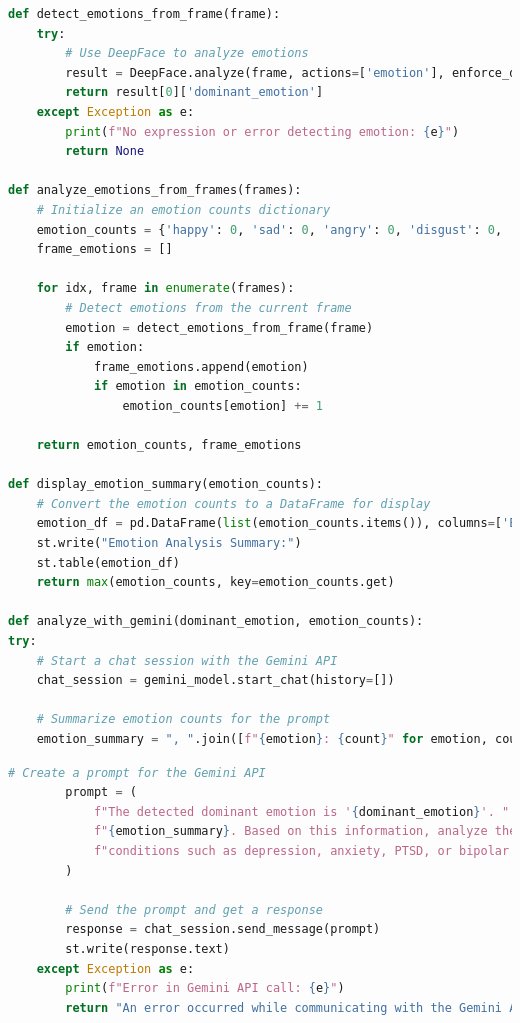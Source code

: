 \pagebreak



\begin{tcolorbox}[colback=gray!5!white, colframe=gray!80!black, boxrule=0.5pt, title=Emotion Analysis and Mental Health Insights]
    \begin{lstlisting}[language=Python]
def detect_emotions_from_frame(frame):
    try:
        # Use DeepFace to analyze emotions
        result = DeepFace.analyze(frame, actions=['emotion'], enforce_detection=False)
        return result[0]['dominant_emotion']
    except Exception as e:
        print(f"No expression or error detecting emotion: {e}")
        return None

def analyze_emotions_from_frames(frames):
    # Initialize an emotion counts dictionary
    emotion_counts = {'happy': 0, 'sad': 0, 'angry': 0, 'disgust': 0, 'fear': 0, 'surprise': 0, 'neutral': 0}
    frame_emotions = []

    for idx, frame in enumerate(frames):
        # Detect emotions from the current frame
        emotion = detect_emotions_from_frame(frame)
        if emotion:
            frame_emotions.append(emotion)
            if emotion in emotion_counts:
                emotion_counts[emotion] += 1

    return emotion_counts, frame_emotions

def display_emotion_summary(emotion_counts):
    # Convert the emotion counts to a DataFrame for display
    emotion_df = pd.DataFrame(list(emotion_counts.items()), columns=['Emotion', 'Count'])
    st.write("Emotion Analysis Summary:")
    st.table(emotion_df)
    return max(emotion_counts, key=emotion_counts.get)

def analyze_with_gemini(dominant_emotion, emotion_counts):
try:
    # Start a chat session with the Gemini API
    chat_session = gemini_model.start_chat(history=[])

    # Summarize emotion counts for the prompt
    emotion_summary = ", ".join([f"{emotion}: {count}" for emotion, count in emotion_counts.items()])
    \end{lstlisting}
\end{tcolorbox}
\begin{tcolorbox}[colback=gray!5!white, colframe=gray!80!black, boxrule=0.5pt, title=Emotion Analysis and Mental Health Insights]
    \begin{lstlisting}[language=Python]
        # Create a prompt for the Gemini API
        prompt = (
            f"The detected dominant emotion is '{dominant_emotion}'. "
            f"{emotion_summary}. Based on this information, analyze the potential implications for mental health "
            f"conditions such as depression, anxiety, PTSD, or bipolar disorder. Provide actionable insights in three lines."
        )

        # Send the prompt and get a response
        response = chat_session.send_message(prompt)
        st.write(response.text)
    except Exception as e:
        print(f"Error in Gemini API call: {e}")
        return "An error occurred while communicating with the Gemini API. Please try again later."
    \end{lstlisting}
\end{tcolorbox}

